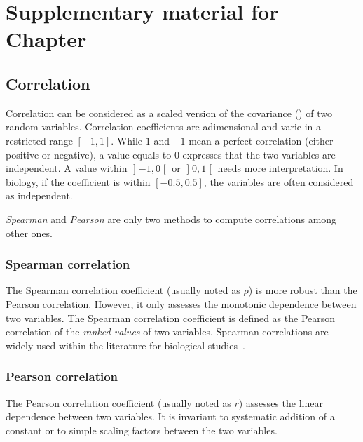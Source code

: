 \chapter[Supp. material for chap. \getrefnumber{ch:expression}]%
{Supplementary material for Chapter }
\label{ch:SupplExpress}

\section{Correlation}\label{sec:CorrMore}
Correlation can be considered as a scaled version of the covariance
() of two random variables.
Correlation coefficients are adimensional and varie in a restricted range $[-1,1]$.
While $1$ and $-1$ mean a perfect correlation (either positive or negative),
a value equals to $0$ expresses that the two variables are independent.
A value within $\mathopen]-1,0\mathclose[$
or $\mathopen]0,1\mathclose[$ needs more interpretation. In biology, if the
coefficient is within $[-0.5,0.5]$, the variables are often considered as
independent.

\emph{Spearman} and \emph{Pearson} are only two methods to compute correlations
among other ones.

\subsection{Spearman correlation}\label{subsec:SpearmanCor}
The Spearman correlation coefficient (usually noted as $\rho$)
is more robust than the Pearson correlation.
However, it only assesses the monotonic dependence between two variables.
The Spearman correlation coefficient is defined
as the Pearson correlation of the \emph{ranked values} of two variables.
Spearman correlations are widely used
within the literature for biological studies~.

\subsection{Pearson correlation}\label{subsec:PearsonCor}
The Pearson correlation coefficient (usually noted as $r$) assesses the linear
dependence between two variables.
It is invariant to systematic addition of a constant
or to simple scaling factors between the two variables.


